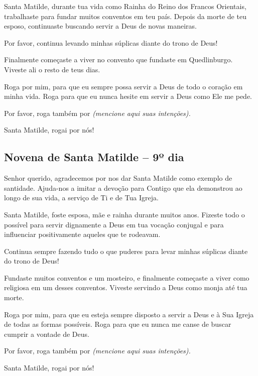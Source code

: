 Santa Matilde, durante tua vida como Rainha do Reino dos Francos Orientais, trabalhaste para fundar muitos conventos em teu país. Depois da morte de teu esposo, continuaste buscando servir a Deus de novas maneiras.

Por favor, continua levando minhas súplicas diante do trono de Deus!

Finalmente começaste a viver no convento que fundaste em Quedlinburgo. Viveste ali o resto de teus dias.

Roga por mim, para que eu sempre possa servir a Deus de todo o coração em minha vida. Roga para que eu nunca hesite em servir a Deus como Ele me pede.

Por favor, roga também por \textit{(mencione aqui suas intenções).}

Santa Matilde, rogai por nós!


\subsection{Novena de Santa Matilde – 9º dia}



Senhor querido, agradecemos por nos dar Santa Matilde como exemplo de santidade. Ajuda-nos a imitar a devoção para Contigo que ela demonstrou ao longo de sua vida, a serviço de Ti e de Tua Igreja.

Santa Matilde, foste esposa, mãe e rainha durante muitos anos. Fizeste todo o possível para servir dignamente a Deus em tua vocação conjugal e para influenciar positivamente aqueles que te rodeavam.

Continua sempre fazendo tudo o que puderes para levar minhas súplicas diante do trono de Deus!

Fundaste muitos conventos e um mosteiro, e finalmente começaste a viver como religiosa em um desses conventos. Viveste servindo a Deus como monja até tua morte.

Roga por mim, para que eu esteja sempre disposto a servir a Deus e à Sua Igreja de todas as formas possíveis. Roga para que eu nunca me canse de buscar cumprir a vontade de Deus.

Por favor, roga também por \textit{(mencione aqui suas intenções).}

Santa Matilde, rogai por nós!


